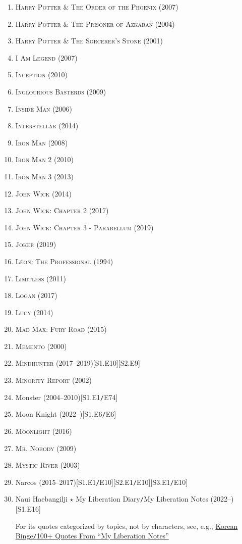 \documentclass[oneside]{book}
\numberwithin{equation}{section}
\begin{document}
\begin{enumerate}
	\item \textsc{Harry Potter \& The Order of the Phoenix} (2007)
	\item \textsc{Harry Potter \& The Prisoner of Azkaban} (2004)
	\item \textsc{Harry Potter \& The Sorcerer's Stone} (2001)
	\item \textsc{I Am Legend} (2007)
	\item \textsc{Inception} (2010)
	\item \textsc{Inglourious Basterds} (2009)
	\item \textsc{Inside Man} (2006)
	\item \textsc{Interstellar} (2014)
	\item \textsc{Iron Man} (2008)
	\item \textsc{Iron Man 2} (2010)
	\item \textsc{Iron Man 3} (2013)
	\item \textsc{John Wick} (2014)
	\item \textsc{John Wick: Chapter 2} (2017)
	\item \textsc{John Wick: Chapter 3 - Parabellum} (2019)
	\item \textsc{Joker} (2019)
	\item \textsc{L\'eon: The Professional} (1994)
	\item \textsc{Limitless} (2011)
	\item \textsc{Logan} (2017)
	\item \textsc{Lucy} (2014)
	\item \textsc{Mad Max: Fury Road} (2015)
	\item \textsc{Memento} (2000)
	\item \textsc{Mindhunter} (2017--2019)\hfill[S1.E10][S2.E9]
	\item \textsc{Minority Report} (2002)
	\item Monster (2004--2010)\hfill[S1.E1\texttt{/}E74]
	\item Moon Knight (2022--)\hfill[S1.E6\texttt{/}E6]
	\item \textsc{Moonlight} (2016)
	\item \textsc{Mr. Nobody} (2009)
	\item \textsc{Mystic River} (2003)
	\item Narcos (2015--2017)\hfill[S1.E1\texttt{/}E10][S2.E1\texttt{/}E10][S3.E1\texttt{/}E10]
	\item Naui Haebangilji $\star$ My Liberation Diary\texttt{/}My Liberation Notes (2022--)\hfill[S1.E16]
	
	For its quotes categorized by topics, not by characters, see, e.g., \href{https://korean-binge.com/2022/04/12/100-quotes-from-my-liberation-notes/}{Korean Binge\texttt{/}100+ Quotes From ``My Liberation Notes''}	
	

\end{enumerate}
\end{document}
